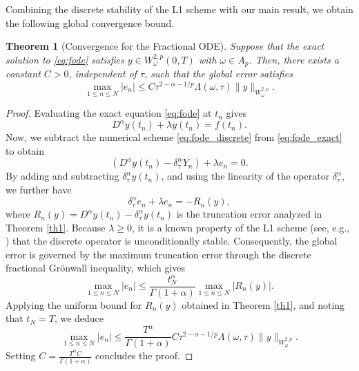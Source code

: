 \documentclass[12pt,a4paper]{article}
\newtheorem{theorem}{Theorem}
\theoremstyle{definition}
\begin{document}
Combining the discrete stability of the L1 scheme with our main result, we obtain the following global convergence bound.
\begin{theorem}[Convergence for the Fractional ODE]
Suppose that the exact solution to \eqref{eq:fode} satisfies $y \in W^{2,p}_\omega(0,T)$ with $\omega \in A_p$. Then, there exists a constant $C > 0$, independent of $\tau$, such that the global error satisfies
\begin{equation}
    \max_{1 \le n \le N} |e_n| \le C \tau^{2-\alpha-1/p} \Lambda(\omega, \tau) \|y\|_{W^{2,p}_\omega}.
\end{equation}
\end{theorem}
\begin{proof}
Evaluating the exact equation \eqref{eq:fode} at $t_n$ gives
\begin{equation} \label{eq:fode_exact}
    D^\alpha y(t_n) + \lambda y(t_n) = f(t_n).
\end{equation}
Now, we subtract the numerical scheme \eqref{eq:fode_discrete} from \eqref{eq:fode_exact} to obtain
\begin{equation}
    (D^\alpha y(t_n) - \delta_\tau^\alpha Y_n) + \lambda e_n = 0.
\end{equation}
By adding and subtracting $\delta_\tau^\alpha y(t_n)$, and using the linearity of the operator $\delta_\tau^\alpha$, we further have
\begin{equation}
    \delta_\tau^\alpha e_n + \lambda e_n = - R_n(y),
\end{equation}
where $R_n(y) = D^\alpha y(t_n) - \delta_\tau^\alpha y(t_n)$ is the truncation error analyzed in Theorem \ref{th1}. Because $\lambda \ge 0$, it is a known property of the L1 scheme (see, e.g., \cite{LiCai2019}) that the discrete operator is unconditionally stable. Consequently, the global error is governed by the maximum truncation error through the discrete fractional Gr\"onwall inequality, which gives
\begin{equation}
    \max_{1 \le n \le N} |e_n| \le \frac{t_N^\alpha}{\Gamma(1+\alpha)} \max_{1 \le n \le N} |R_n(y)|.
\end{equation}
Applying the uniform bound for $R_n(y)$ obtained in Theorem \ref{th1}, and noting that $t_N = T$, we deduce
\begin{equation}
    \max_{1 \le n \le N} |e_n| \le \frac{T^\alpha}{\Gamma(1+\alpha)} C \tau^{2-\alpha-1/p} \Lambda(\omega, \tau) \|y\|_{W^{2,p}_\omega}.
\end{equation}
Setting $C = \frac{T^\alpha C}{\Gamma(1+\alpha)}$ concludes the proof.
\end{proof}
\end{document}
